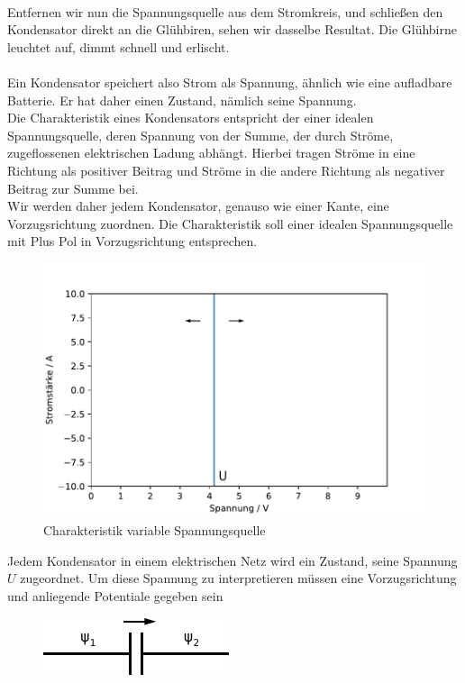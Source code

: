 \documentclass[11pt,a4paper,leqno]{report}
\numberwithin{equation}{chapter}
\begin{document}
 \\
 Entfernen wir nun die Spannungsquelle aus dem Stromkreis, und schlie\ss{}en den Kondensator direkt an die Gl\"uhbiren, sehen wir dasselbe Resultat. Die Gl\"uhbirne leuchtet auf, dimmt schnell und erlischt.\\
 \\
 Ein Kondensator speichert also Strom als Spannung, \"ahnlich wie eine aufladbare Batterie. Er hat daher einen Zustand, n\"amlich seine Spannung. \\
 Die Charakteristik eines Kondensators entspricht der einer idealen Spannungsquelle, deren Spannung von der Summe, der durch Str\"ome, zugeflossenen elektrischen Ladung abh\"angt. Hierbei tragen Str\"ome in eine Richtung als positiver Beitrag und Str\"ome in die andere Richtung als negativer Beitrag zur Summe bei.\\
 Wir werden daher jedem Kondensator, genauso wie einer Kante, eine Vorzugsrichtung zuordnen. Die Charakteristik soll einer idealen Spannungsquelle mit Plus Pol in Vorzugsrichtung entsprechen.
  \begin{figure}[H]
 	\begin{center}
 		\includegraphics[scale=0.5]{variable_Spannungsquelle.pdf}
 		\caption{Charakteristik variable Spannungsquelle}
 	\end{center}
 \end{figure}
 \noindent
Jedem Kondensator in einem elektrischen Netz wird ein Zustand, seine Spannung $U$ zugeordnet. Um diese Spannung zu interpretieren m\"ussen eine Vorzugsrichtung und anliegende Potentiale gegeben sein
  \begin{figure}[H]
	\begin{center}
		\includegraphics[scale=1]{kkondens.pdf}
	\end{center}
\end{figure}
\end{document}

